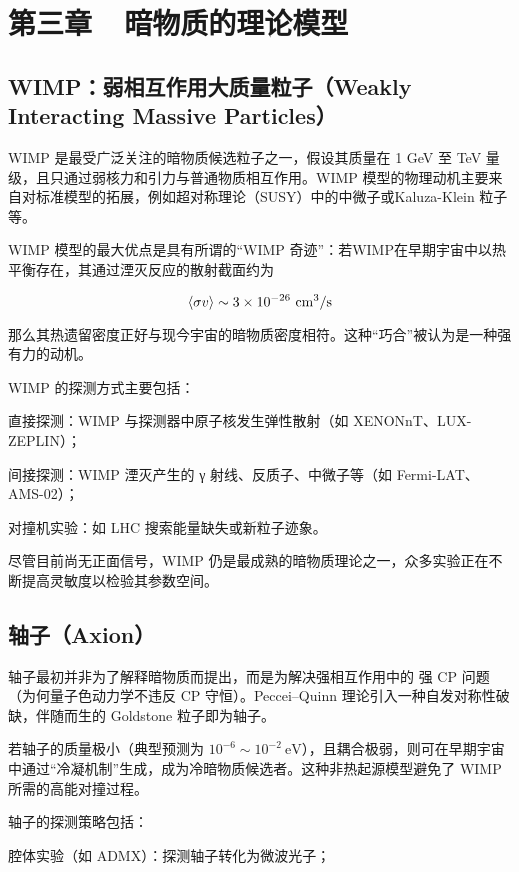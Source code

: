 \section*{第三章~~暗物质的理论模型}
\setcounter{section}{3} \setcounter{subsection}{0} 
\setcounter{table}{0} \setcounter{figure}{0} \setcounter{equation}{0}

\subsection{WIMP：弱相互作用大质量粒子（Weakly Interacting Massive Particles）}

WIMP 是最受广泛关注的暗物质候选粒子之一，假设其质量在 1 GeV 至 TeV 量级，且只通过弱核力和引力与普通物质相互作用。WIMP 模型的物理动机主要来自对标准模型的拓展，例如超对称理论（SUSY）中的中微子或Kaluza-Klein 粒子等。

WIMP 模型的最大优点是具有所谓的“WIMP 奇迹”：若WIMP在早期宇宙中以热平衡存在，其通过湮灭反应的散射截面约为

$$
\Braket{\sigma v} \sim 3\times 10^{-26}~\mathrm{cm^3/s}
$$

那么其热遗留密度正好与现今宇宙的暗物质密度相符。这种“巧合”被认为是一种强有力的动机。

WIMP 的探测方式主要包括：

直接探测：WIMP 与探测器中原子核发生弹性散射（如 XENONnT、LUX-ZEPLIN）；

间接探测：WIMP 湮灭产生的 γ 射线、反质子、中微子等（如 Fermi-LAT、AMS-02）；

对撞机实验：如 LHC 搜索能量缺失或新粒子迹象。

尽管目前尚无正面信号，WIMP 仍是最成熟的暗物质理论之一，众多实验正在不断提高灵敏度以检验其参数空间。

\subsection{轴子（Axion）}

轴子最初并非为了解释暗物质而提出，而是为解决强相互作用中的 强 CP 问题（为何量子色动力学不违反 CP 守恒）。Peccei–Quinn 理论引入一种自发对称性破缺，伴随而生的 Goldstone 粒子即为轴子。

若轴子的质量极小（典型预测为 $10^{-6} \sim 10^{-2}~ \mathrm{eV} $），且耦合极弱，则可在早期宇宙中通过“冷凝机制”生成，成为冷暗物质候选者。这种非热起源模型避免了 WIMP 所需的高能对撞过程。

轴子的探测策略包括：

腔体实验（如 ADMX）：探测轴子转化为微波光子；

